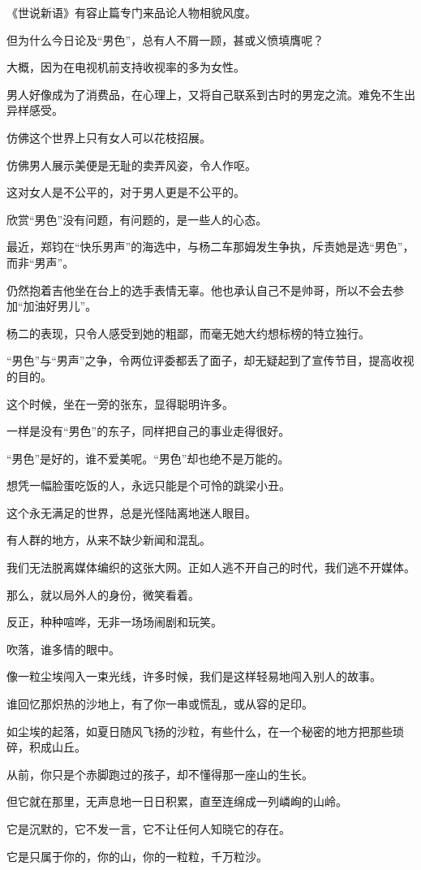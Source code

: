 		《世说新语》有容止篇专门来品论人物相貌风度。\par
		但为什么今日论及“男色”，总有人不屑一顾，甚或义愤填膺呢？\par
		大概，因为在电视机前支持收视率的多为女性。\par
		男人好像成为了消费品，在心理上，又将自己联系到古时的男宠之流。难免不生出异样感受。\par
		仿佛这个世界上只有女人可以花枝招展。\par
		仿佛男人展示美便是无耻的卖弄风姿，令人作呕。\par
		这对女人是不公平的，对于男人更是不公平的。\par
		欣赏“男色”没有问题，有问题的，是一些人的心态。\par
		最近，郑钧在“快乐男声”的海选中，与杨二车那姆发生争执，斥责她是选“男色”，而非“男声”。\par
		仍然抱着吉他坐在台上的选手表情无辜。他也承认自己不是帅哥，所以不会去参加“加油好男儿”。\par
		杨二的表现，只令人感受到她的粗鄙，而毫无她大约想标榜的特立独行。\par
		“男色”与“男声”之争，令两位评委都丢了面子，却无疑起到了宣传节目，提高收视的目的。\par
		这个时候，坐在一旁的张东，显得聪明许多。\par
		一样是没有“男色”的东子，同样把自己的事业走得很好。\par
		“男色”是好的，谁不爱美呢。“男色”却也绝不是万能的。\par
		想凭一幅脸蛋吃饭的人，永远只能是个可怜的跳梁小丑。

		这个永无满足的世界，总是光怪陆离地迷人眼目。\par
		有人群的地方，从来不缺少新闻和混乱。\par
		我们无法脱离媒体编织的这张大网。正如人逃不开自己的时代，我们逃不开媒体。\par
		那么，就以局外人的身份，微笑看着。\par
		反正，种种喧哗，无非一场场闹剧和玩笑。

	\endwriting



		吹落，谁多情的眼中。

		\vspace{1em}
		像一粒尘埃闯入一束光线，许多时候，我们是这样轻易地闯入别人的故事。

		谁回忆那炽热的沙地上，有了你一串或慌乱，或从容的足印。\par
		如尘埃的起落，如夏日随风飞扬的沙粒，有些什么，在一个秘密的地方把那些琐碎，积成山丘。\par
		从前，你只是个赤脚跑过的孩子，却不懂得那一座山的生长。\par
		但它就在那里，无声息地一日日积累，直至连绵成一列嶙峋的山岭。\par
		它是沉默的，它不发一言，它不让任何人知晓它的存在。\par
		它是只属于你的，你的山，你的一粒粒，千万粒沙。

